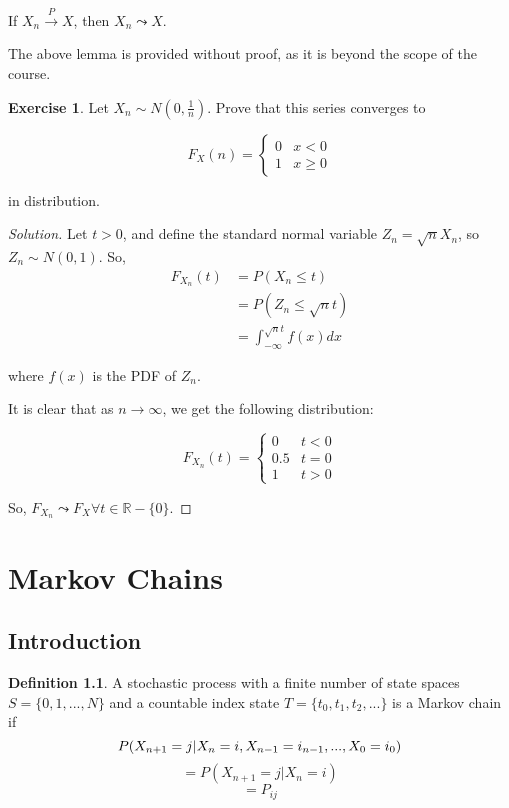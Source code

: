 \documentclass[12pt,letterpaper]{amsbook}
\theoremstyle{definition}
\newtheorem{definition}{Definition}%
\newtheorem*{exercise}{Exercise}
\newenvironment{solution}
  {\renewcommand\qedsymbol{$\blacksquare$}\begin{proof}[Solution]}
  {\end{proof}}
\newcommand{\R}{\mathbb{R}}
\begin{document}
\begin{lemma}
  If $X_n \xrightarrow{P} X$, then $X_n \leadsto X$.
\end{lemma}

The above lemma is provided without proof, as it is beyond the scope of the course.

\begin{exercise}

Let $X_n \sim N(0,\frac{1}{n})$. Prove that this series converges to 

\[ F_X(n) = \begin{cases}
0 & x < 0 \\
1 & x \geq 0
\end{cases}\]

in distribution. 

\begin{solution}
Let $t > 0$, and define the standard normal variable $Z_n = \sqrt{n}X_n$, so $Z_n \sim N(0,1)$. So,
\begin{align*}
  F_{X_n}(t) &= P(X_n \leq t) \\
             &= P(Z_n \leq \sqrt{n}t) \\
             &= \int_{-\infty} ^{\sqrt{n}t} f(x) dx
\end{align*}

where $f(x)$ is the PDF of $Z_n$.

It is clear that as $n \rightarrow \infty$, we get the following distribution:

\[F_{X_n}(t) = \begin{cases}
  0 & t < 0 \\
  0.5 & t = 0 \\
  1 & t > 0
\end{cases}\]

So, $F_{X_n} \leadsto F_X \forall t \in \R - \{0\}$.
\end{solution}
\end{exercise}

\chapter{Markov Chains}

\section{Introduction}

\begin{definition}
  A stochastic process with a finite number of state spaces $S = \{0,1,...,N\}$ and a countable index state $T = \{t_0,t_1,t_2,...\}$ is a Markov chain if
  \[P(X_{n+1} = j|X_n = i, X_{n-1} = i_{n-1},...,X_0 = i_0) \\ \]
  \[= P(X_{n+1} = j | X_n = i) \]
  \[= P_{ij}\]
\end{definition}
\end{document}
